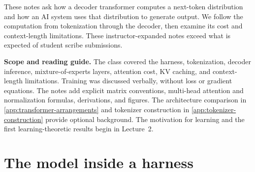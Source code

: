 \documentclass[11pt,twoside]{article}
\theoremstyle{plain}
\theoremstyle{definition}
\theoremstyle{remark}
\begin{document}
\begin{center}
\end{center}

These notes ask how a decoder transformer computes a next-token distribution
and how an AI system uses that distribution to generate output. We follow
the computation from tokenization through the decoder, then examine its
cost and context-length limitations. These instructor-expanded notes exceed
what is expected of student scribe submissions.

\noindent\textbf{Scope and reading guide.}
The class covered the harness, tokenization, decoder inference,
mixture-of-experts layers, attention cost, KV caching, and context-length
limitations. Training was discussed verbally, without loss or gradient
equations. The notes add explicit matrix conventions, multi-head attention
and normalization formulas, derivations, and figures. The architecture
comparison in \cref{app:transformer-arrangements} and tokenizer construction
in \cref{app:tokenizer-construction} provide optional background. The
motivation for learning and the first learning-theoretic results begin in
Lecture~2.

\section{The model inside a harness}
\end{document}
